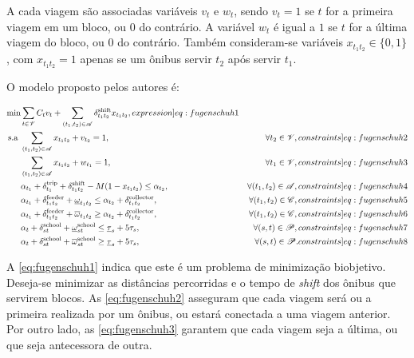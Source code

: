 A cada viagem são associadas variáveis $v_t$ e $w_t$, sendo $v_t = 1$ se $t$ for a primeira viagem em um bloco, ou $0$ do contrário. A variável $w_t$ é igual a $1$ se $t$ for a última viagem do bloco, ou $0$ do contrário. Também consideram-se variáveis $x_{t_1t_2} \in \{0,1\}$, com $x_{t_1t_2} = 1$ apenas se um ônibus servir $t_2$ após servir $t_1$.

O modelo proposto pelos autores é:

\begin{align}
    \min&\sum_{t \in \mcal{V}}C_tv_t + \sum_{(t_1,t_2) \in \mcal{A}}\delta_{t_1t_2}^{\text{shift}}x_{t_1t_2},\label[expression]{eq:fugenschuh1}\\
    \text{s.a }&\sum_{(t_1,t_2) \in \mcal{A}}x_{t_1t_2} + v_{t_2} = 1,&\forall t_2 \in \mcal{V},\label[constraints]{eq:fugenschuh2}\\
    &\sum_{(t_1,t_2) \in \mcal{A}}x_{t_1t_2} + w_{t_1} = 1,&\forall t_1 \in \mcal{V},\label[constraints]{eq:fugenschuh3}\\
    &\alpha_{t_1} + \delta_{t_1}^{\text{trip}} + \delta_{t_1t_2}^{\text{shift}} - M (1-x_{t_1t_2}) \leq \alpha_{t_2},&\forall(t_1,t_2) \in \mcal{A},\label[constraints]{eq:fugenschuh4}\\
    &\alpha_{t_1} + \delta_{t_1t_2}^{\text{feeder}} + \underline{\omega}_{t_1t_2} \leq \alpha_{t_2} + \delta_{t_1t_2}^{\text{collector}},&\forall(t_1,t_2)\in\mcal{C},\label[constraints]{eq:fugenschuh5}\\
    &\alpha_{t_1} + \delta_{t_1t_2}^{\text{feeder}} + \overline{\omega}_{t_1t_2} \geq \alpha_{t_2} + \delta_{t_1t_2}^{\text{collector}},&\forall(t_1,t_2)\in\mcal{C},\label[constraints]{eq:fugenschuh6}\\
    &\alpha_t + \delta_{st}^{\text{school}} + \underline{\omega}_{st}^{\text{school}} \leq \underline{\tau}_s + 5\tau_s,&\forall(s,t) \in \mcal{P},\label[constraints]{eq:fugenschuh7}\\
    &\alpha_t + \delta_{st}^{\text{school}} + \overline{\omega}_{st}^{\text{school}} \geq \underline{\tau}_s + 5\tau_s,&\forall(s,t) \in \mcal{P}.\label[constraints]{eq:fugenschuh8}
\end{align}

A \cref{eq:fugenschuh1} indica que este é um problema de minimização biobjetivo. Deseja-se minimizar as distâncias percorridas e o tempo de \emph{shift} dos ônibus que servirem blocos. As \cref{eq:fugenschuh2} asseguram que cada viagem será ou a primeira realizada por um ônibus, ou estará conectada a uma viagem anterior. Por outro lado, as \cref{eq:fugenschuh3} garantem que cada viagem seja a última, ou que seja antecessora de outra.

